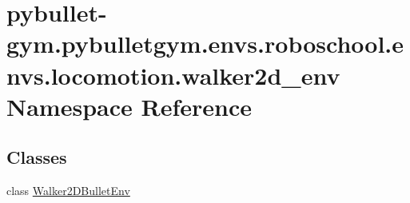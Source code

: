 \hypertarget{namespacepybullet-gym_1_1pybulletgym_1_1envs_1_1roboschool_1_1envs_1_1locomotion_1_1walker2d__env}{}\section{pybullet-\/gym.pybulletgym.\+envs.\+roboschool.\+envs.\+locomotion.\+walker2d\+\_\+env Namespace Reference}
\label{namespacepybullet-gym_1_1pybulletgym_1_1envs_1_1roboschool_1_1envs_1_1locomotion_1_1walker2d__env}
\subsection*{Classes}
\begin{DoxyCompactItemize}
\item 
class \hyperlink{classpybullet-gym_1_1pybulletgym_1_1envs_1_1roboschool_1_1envs_1_1locomotion_1_1walker2d__env_1_1_walker2_d_bullet_env}{Walker2\+D\+Bullet\+Env}
\end{DoxyCompactItemize}
